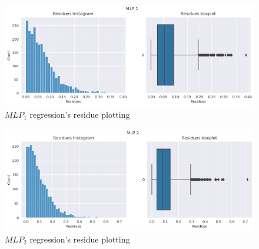 \documentclass[12pt]{article}
\begin{document}
\begin{figure}[h]
  \centering
  \includegraphics[width=\textwidth]{../assets/mlp1-plots.png}
  \caption{$MLP_1$ regression's residue plotting}
  \label{fig:mlp1-plotting}
\end{figure}

\begin{figure}[h]
  \centering
  \includegraphics[width=\textwidth]{../assets/mlp2-plots.png}
  \caption{$MLP_2$ regression's residue plotting}
  \label{fig:mlp2-plotting}
\end{figure}
\end{document}
